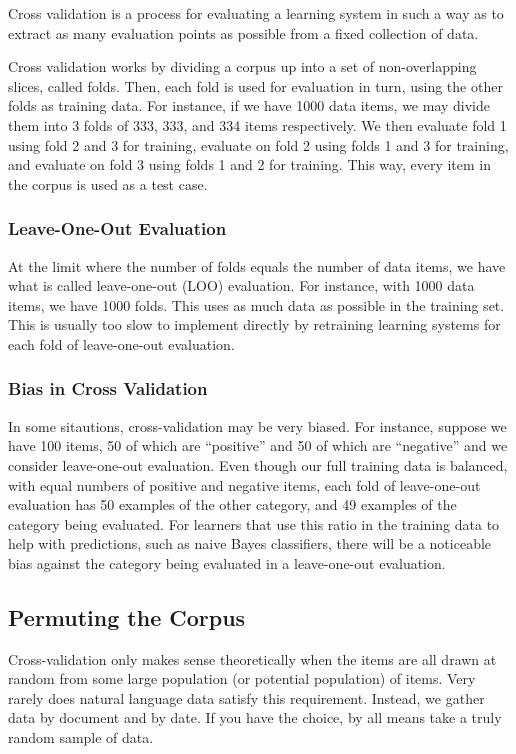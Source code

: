 Cross validation is a process for evaluating a learning system in such
a way as to extract as many evaluation points as possible from a fixed
collection of data.

Cross validation works by dividing a corpus up into a set of
non-overlapping slices, called folds.  Then, each fold is used for
evaluation in turn, using the other folds as training data.  For
instance, if we have 1000 data items, we may divide them into 3 folds
of 333, 333, and 334 items respectively.  We then evaluate fold 1
using fold 2 and 3 for training, evaluate on fold 2 using folds 1 and
3 for training, and evaluate on fold 3 using folds 1 and 2 for
training.  This way, every item in the corpus is used as a test case.

\subsubsection{Leave-One-Out Evaluation}

At the limit where the number of folds equals the number of data
items, we have what is called leave-one-out (LOO) evaluation.  For
instance, with 1000 data items, we have 1000 folds.  This uses as much
data as possible in the training set.  This is usually too slow to
implement directly by retraining learning systems for each fold of
leave-one-out evaluation.


\subsubsection{Bias in Cross Validation}

In some sitautions, cross-validation may be very biased.  For
instance, suppose we have 100 items, 50 of which are ``positive'' and
50 of which are ``negative'' and we consider leave-one-out evaluation.
Even though our full training data is balanced, with equal numbers of
positive and negative items, each fold of leave-one-out evaluation has
50 examples of the other category, and 49 examples of the category
being evaluated.  For learners that use this ratio in the training
data to help with predictions, such as naive Bayes classifiers, there
will be a noticeable bias against the category being evaluated in a
leave-one-out evaluation.

\subsection{Permuting the Corpus}

Cross-validation only makes sense theoretically when the items are all
drawn at random from some large population (or potential population)
of items.  Very rarely does natural language data satisfy this
requirement.  Instead, we gather data by document and by date.  If you
have the choice, by all means take a truly random sample of data.

